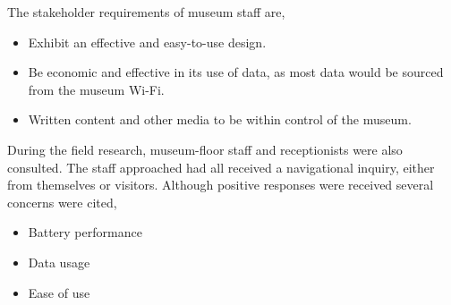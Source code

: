 The stakeholder requirements of museum staff are,

\begin{itemize}
    \item Exhibit an effective and easy-to-use design. 
    \item Be economic and effective in its use of data, as most data would be sourced from the museum Wi-Fi. 
    \item Written content and other media to be within control of the museum.
\end{itemize}

During the field research, museum-floor staff and receptionists were also consulted. The staff approached had all received a navigational inquiry, either from themselves or visitors. Although positive responses were received several concerns were cited,\\

\begin{itemize}
    \item Battery performance
    \item Data usage
    \item Ease of use
\end{itemize}